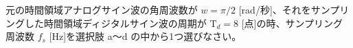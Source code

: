 元の時間領域アナログサイン波の角周波数が $w = \pi/2$ [rad/秒]、それをサンプリングした時間領域ディジタルサイン波の周期が $\textrm{T}_d = 8$ [点]の時、サンプリング周波数 $f_s$ [Hz]を選択肢 a〜d の中から1つ選びなさい。
